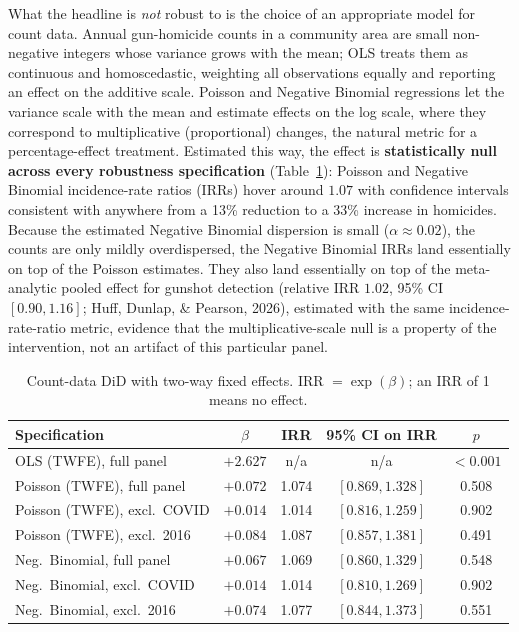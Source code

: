 \documentclass[12pt]{article}
\begin{document}
What the headline is \emph{not} robust to is the choice of an appropriate model for count
data. Annual gun-homicide counts in a community area are small non-negative integers
whose variance grows with the mean; OLS treats them as continuous and homoscedastic,
weighting all observations equally and reporting an effect on the additive scale.
Poisson and Negative Binomial regressions let the variance scale with the mean and
estimate effects on the log scale, where they correspond to multiplicative (proportional)
changes, the natural metric for a percentage-effect treatment. Estimated this way, the
effect is \textbf{statistically null across every robustness specification}
(Table~\ref{tab:count}): Poisson and Negative Binomial incidence-rate ratios (IRRs)
hover around $1.07$ with confidence intervals consistent with anywhere from a 13\%
reduction to a 33\% increase in homicides. Because the estimated Negative Binomial
dispersion is small ($\alpha \approx 0.02$), the counts are only mildly
overdispersed, the Negative Binomial IRRs land essentially on top of the Poisson
estimates. They also land essentially on top of the meta-analytic pooled effect for
gunshot detection (relative IRR $1.02$, 95\% CI $[0.90, 1.16]$; Huff, Dunlap, \& Pearson,
2026), estimated with the same incidence-rate-ratio metric, evidence that the multiplicative-scale null is a property of the intervention, not an artifact of this
particular panel.

\begin{table}[H]
\centering
\small
\caption{Count-data DiD with two-way fixed effects. IRR $= \exp(\beta)$; an IRR of 1
means no effect.}
\label{tab:count}
\begin{tabular}{lcccc}
\toprule
Specification & $\beta$ & IRR & 95\% CI on IRR & $p$ \\
\midrule
OLS (TWFE), full panel                 & $+2.627$ & n/a     & n/a              & $<0.001$ \\
\midrule
Poisson (TWFE), full panel             & $+0.072$ & 1.074 & $[0.869, 1.328]$ & 0.508 \\
Poisson (TWFE), excl.\ COVID           & $+0.014$ & 1.014 & $[0.816, 1.259]$ & 0.902 \\
Poisson (TWFE), excl.\ 2016            & $+0.084$ & 1.087 & $[0.857, 1.381]$ & 0.491 \\
\midrule
Neg.\ Binomial, full panel             & $+0.067$ & 1.069 & $[0.860, 1.329]$ & 0.548 \\
Neg.\ Binomial, excl.\ COVID           & $+0.014$ & 1.014 & $[0.810, 1.269]$ & 0.902 \\
Neg.\ Binomial, excl.\ 2016            & $+0.074$ & 1.077 & $[0.844, 1.373]$ & 0.551 \\
\bottomrule
\end{tabular}
\end{table}
\end{document}
